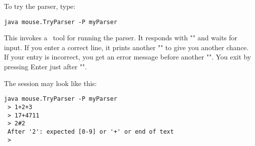 To try the parser, type:
       
\small
\begin{Verbatim}[samepage=true,xleftmargin=15mm,baselinestretch=0.8]
 java mouse.TryParser -P myParser
\end{Verbatim}
\normalsize
  
This invokes a \Mouse\ tool for running the parser.
It responds with "\tx{> }" and waits for input.
If you enter a correct line, 
it prints another "\tx{> }" to give you another chance.
If your entry is incorrect, you get an error message
before another "\tx{> }".
You exit by pressing Enter just after "\tx{> }".

The session may look like this:
 
\small
\begin{Verbatim}[samepage=true,xleftmargin=15mm,baselinestretch=0.8]
 java mouse.TryParser -P myParser
 > 1+2+3
 > 17+4711
 > 2#2
 After '2': expected [0-9] or '+' or end of text
 >
\end{Verbatim}
\normalsize
